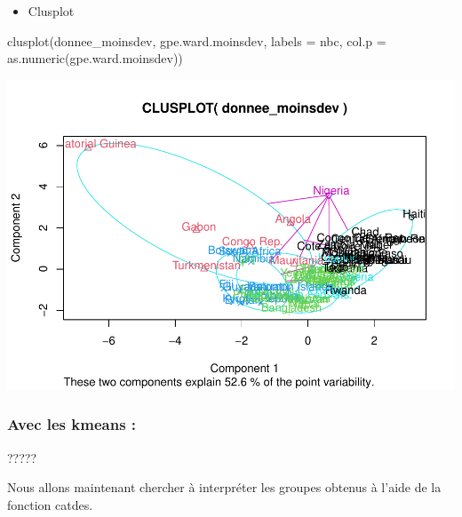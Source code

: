 \documentclass[
]{article}
\newenvironment{Shaded}{}{}
\newcommand{\AttributeTok}[1]{#1}
\newcommand{\DecValTok}[1]{#1}
\newcommand{\FunctionTok}[1]{#1}
\newcommand{\NormalTok}[1]{#1}
\newcommand{\OtherTok}[1]{\textcolor[rgb]{1.00,0.25,0.00}{#1}}
\newcommand{\SpecialCharTok}[1]{\textcolor[rgb]{0.00,0.50,0.50}{#1}}
\providecommand{\tightlist}{%
  \setlength{\itemsep}{0pt}\setlength{\parskip}{0pt}}
\begin{document}
\begin{itemize}
\tightlist
\item
  Clusplot
\end{itemize}

\begin{Shaded}
\begin{Highlighting}[]
\FunctionTok{clusplot}\NormalTok{(donnee\_moinsdev, gpe.ward.moinsdev, }\AttributeTok{labels =}\NormalTok{ nbc, }\AttributeTok{col.p =} \FunctionTok{as.numeric}\NormalTok{(gpe.ward.moinsdev))}
\end{Highlighting}
\end{Shaded}

\includegraphics{Projet_files/figure-latex/unnamed-chunk-36-1.pdf}

\hypertarget{avec-les-kmeans}{%
\subsubsection{Avec les kmeans :}\label{avec-les-kmeans}}

?????

Nous allons maintenant chercher à interpréter les groupes obtenus à
l'aide de la fonction catdes.

\begin{Shaded}
\end{Shaded}
\end{document}

